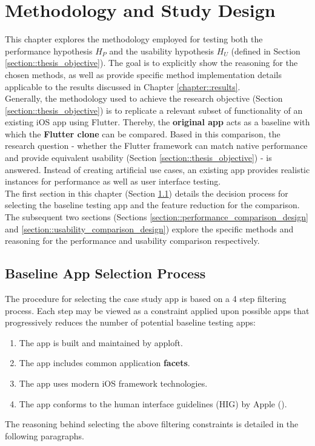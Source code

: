 \chapter{Methodology and Study Design} \label{chapter::study_design}
This chapter explores the methodology employed for testing both the performance hypothesis $H_P$ and the usability hypothesis $H_U$ (defined in Section \ref{section::thesis_objective}). 
The goal is to explicitly show the reasoning for the chosen methods, as well as provide specific method implementation details applicable to the results discussed in Chapter \ref{chapter::results}.\\
Generally, the methodology used to achieve the research objective (Section \ref{section::thesis_objective}) is to replicate a relevant subset of functionality of an existing iOS app using Flutter. Thereby, the \textbf{original app} acts as a baseline with which the \textbf{Flutter clone} 
can be compared. Based in this comparison, the research question - whether the Flutter framework can match native performance and provide equivalent usability (Section \ref{section::thesis_objective}) - is answered.
Instead of creating artificial use cases, an existing app provides realistic instances for performance as well as user interface testing.\\
The first section in this chapter (Section \ref{section::facet_selection}) details the decision process for selecting the baseline testing app and the feature reduction for the comparison. 
The subsequent two sections (Sections \ref{section::performance_comparison_design} and \ref{section::usability_comparison_design}) explore the specific methods and reasoning for the performance and 
usability comparison respectively.

\section{Baseline App Selection Process} \label{section::facet_selection}
The procedure for selecting the case study app is based on a 4 step filtering process. Each step may be viewed as a constraint
applied upon possible apps that progressively reduces the number of potential baseline testing apps:
\begin{enumerate}
    \item The app is built and maintained by apploft. \label{item::constraint_one}
    \item The app includes common application \textbf{facets}. \label{item::constraint_two}
    \item The app uses modern iOS framework technologies. \label{item::constraint_three}
    \item The app conforms to the human interface guidelines (HIG) by Apple (\cite{Apple2021a}). \label{item::constraint_four}
\end{enumerate}
The reasoning behind selecting the above filtering constraints is detailed in the following paragraphs.

